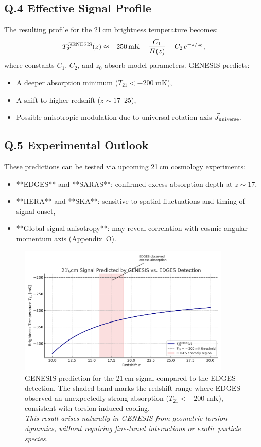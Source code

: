 \documentclass{article}
\begin{document}
\subsection*{Q.4 Effective Signal Profile}
The resulting profile for the 21\,cm brightness temperature becomes:
\begin{equation}
T_{21}^{\rm GENESIS}(z) \approx -250\,\mathrm{mK} - \frac{C_1}{H(z)} + C_2\,e^{-z/z_0},
\end{equation}
where constants \(C_1\), \(C_2\), and \(z_0\) absorb model parameters. GENESIS predicts:
\begin{itemize}
  \item A deeper absorption minimum (\(T_{21} < -200\;\mathrm{mK}\)),
  \item A shift to higher redshift (\(z \sim 17\)–25),
  \item Possible anisotropic modulation due to universal rotation axis \(\vec{J}_{\rm universe}\).
\end{itemize}

\subsection*{Q.5 Experimental Outlook}
These predictions can be tested via upcoming 21\,cm cosmology experiments:
\begin{itemize}
  \item **EDGES** and **SARAS**: confirmed excess absorption depth at \(z \sim 17\),
  \item **HERA** and **SKA**: sensitive to spatial fluctuations and timing of signal onset,
  \item **Global signal anisotropy**: may reveal correlation with cosmic angular momentum axis (Appendix~O).
\end{itemize}

\begin{figure}[h!]
\centering
\includegraphics[width=0.9\textwidth]{T21_GENESIS_with_EDGES.png}
\caption{
GENESIS prediction for the 21\,cm signal compared to the EDGES detection.
The shaded band marks the redshift range where EDGES observed an unexpectedly strong absorption ($T_{21} < -200$ mK), consistent with torsion-induced cooling.\\
\textit{This result arises naturally in GENESIS from geometric torsion dynamics, without requiring fine-tuned interactions or exotic particle species.}
}
\label{fig:T21_EDGES}
\end{figure}
\end{document}

